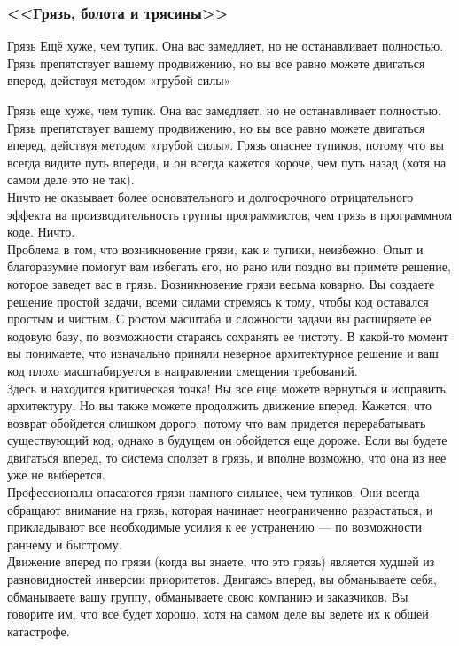 \documentclass{../industrial-development}
\begin{document}
\begin{frame} \frametitle{<<Грязь, болота и трясины>>}
\begin{block}{Грязь}
Ещё хуже, чем тупик. Она вас замедляет, но не останавливает полностью. Грязь препятствует вашему продвижению, но вы все равно можете двигаться вперед, действуя методом «грубой силы»
\end{block}
\end{frame}
\lecturenotes
Грязь еще хуже, чем тупик. Она вас замедляет, но не останавливает полностью. Грязь препятствует вашему продвижению, но вы все равно можете двигаться вперед, действуя методом «грубой силы». Грязь опаснее тупиков, потому что вы всегда видите путь впереди, и он всегда кажется короче, чем путь назад (хотя на самом деле это не так).\\
Ничто не оказывает более основательного и долгосрочного отрицательного эффекта на производительность группы программистов, чем грязь в программном коде. Ничто.\\
Проблема в том, что возникновение грязи, как и тупики, неизбежно. Опыт и благоразумие помогут вам избегать его, но рано или поздно вы примете решение, которое заведет вас в грязь. Возникновение грязи весьма коварно. Вы создаете решение простой задачи, всеми силами стремясь к тому, чтобы код оставался простым и чистым. С ростом масштаба и сложности задачи вы расширяете ее кодовую базу, по возможности стараясь сохранять ее чистоту. В какой-то момент вы понимаете, что изначально приняли неверное архитектурное решение и ваш код плохо масштабируется в направлении смещения требований.\\
Здесь и находится критическая точка! Вы все еще можете вернуться и исправить архитектуру. Но вы также можете продолжить движение вперед. Кажется, что возврат обойдется слишком дорого, потому что вам придется перерабатывать существующий код, однако в будущем он обойдется еще дороже. Если вы будете двигаться вперед, то система сползет в грязь, и вполне возможно, что она из нее уже не выберется.\\
Профессионалы опасаются грязи намного сильнее, чем тупиков. Они всегда обращают внимание на грязь, которая начинает неограниченно разрастаться, и прикладывают все необходимые усилия к ее устранению — по возможности раннему и быстрому.\\
Движение вперед по грязи (когда вы знаете, что это грязь) является худшей из разновидностей инверсии приоритетов. Двигаясь вперед, вы обманываете себя, обманываете вашу группу, обманываете свою компанию и заказчиков. Вы говорите им, что все будет хорошо, хотя на самом деле вы ведете их к общей катастрофе.
\end{document}
